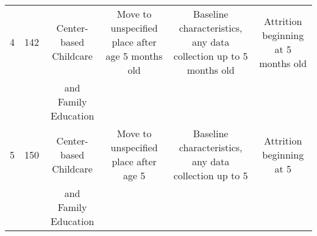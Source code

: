 \begin{sidewaystable}[H]
\begin{threeparttable}
\begin{tabular}{cccccc}
4 & 142 & Center-based Childcare & Move to unspecified place after age 5 months old & Baseline characteristics, any data collection up to 5 months old & Attrition beginning at 5 months old \\
 &  & and Family Education &  &  & \\
5 & 150 & Center-based Childcare & Move to unspecified place after age 5 & Baseline characteristics, any data collection up to 5 & Attrition beginning at 5 \\
 &  & and Family Education &  &  & \\ \hline \hline 
\end{tabular}
\end{threeparttable}
\end{sidewaystable}


 